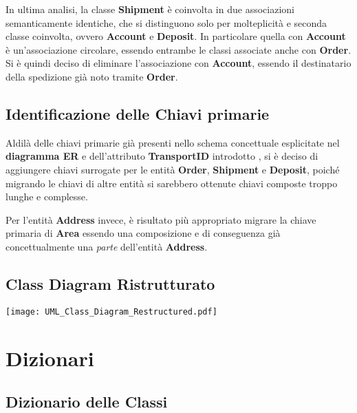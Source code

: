 In ultima analisi, la classe \textbf{Shipment} è coinvolta in due associazioni semanticamente identiche, che si distinguono solo per molteplicità e seconda classe coinvolta, ovvero \textbf{Account} e \textbf{Deposit}. In particolare quella con \textbf{Account} è un'associazione circolare, essendo entrambe le classi associate anche con \textbf{Order}. Si è quindi deciso di eliminare l'associazione con \textbf{Account}, essendo il destinatario della spedizione già noto tramite \textbf{Order}.

\subsection{Identificazione delle Chiavi primarie}\label{individuazioneDelleChiaviPrimarie}

Aldilà delle chiavi primarie già presenti nello schema concettuale esplicitate nel \textbf{diagramma ER} e dell'attributo \textbf{TransportID} introdotto , si è deciso di aggiungere chiavi surrogate per le entità \textbf{Order}, \textbf{Shipment} e \textbf{Deposit}, poiché migrando le chiavi di altre entità si sarebbero ottenute chiavi composte troppo lunghe e complesse.

Per l'entità \textbf{Address} invece, è risultato più appropriato migrare la chiave primaria di \textbf{Area} essendo una composizione e di conseguenza già concettualmente una \textit{parte} dell'entità \textbf{Address}. 

\newpage

\subsection{Class Diagram Ristrutturato}

\begin{center}
  \texttt{[image: UML\_Class\_Diagram\_Restructured.pdf]} 
\end{center}

\newpage

\section{Dizionari}

\subsection{Dizionario delle Classi}


